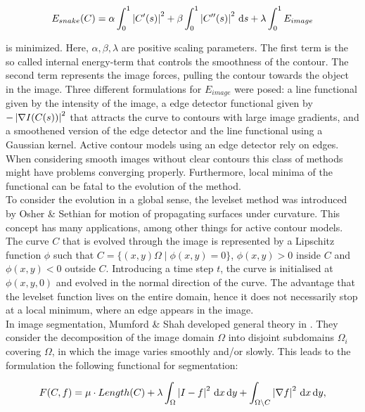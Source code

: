 \begin{equation}
  E_{snake}(C) = \alpha\int_0^1 \left| {C'(s)} \right|^2  + \beta\int_0^1 \left| {C''(s)} \right|^2\,{\rm d} s + \lambda\int_0^1 E_{image}
\end{equation}

is minimized. Here, $\alpha, \beta, \lambda$ are positive scaling parameters. The first term is the so called internal energy-term that controls the smoothness of the contour. The second term represents the image forces, pulling the contour towards the object in the image. Three different formulations for $E_{image}$ were posed: a line functional given by the intensity of the image, a edge detector functional given by $-\left| {\nabla I(C(s))} \right|^2$ that attracts the curve to contours with large image gradients, and a smoothened version of the edge detector and the line functional using a Gaussian kernel. Active contour models using an edge detector rely on edges. When considering smooth images without clear contours this class of methods might have problems converging properly. Furthermore, local minima of the functional can be fatal to the evolution of the method.\\

To consider the evolution in a global sense, the levelset method was introduced by Osher \& Sethian \cite{osher.88} for motion of propagating surfaces under curvature. This concept has many applications, among other things for active contour models. The curve $C$ that is evolved through the image is represented by a Lipschitz function $\phi$ such that $C=\{(x,y)\Omega\;|\; \phi(x,y) = 0\}$, $\phi(x,y)> 0$ inside $C$ and $\phi(x,y)<0$ outside $C$. Introducing a time step $t$, the curve is initialised at $\phi(x,y,0)$ and evolved in the normal direction of the curve. The advantage that the levelset function lives on the entire domain, hence it does not necessarily stop at a local minimum, where an edge appears in the image.\\

In image segmentation, Mumford \& Shah developed general theory in \cite{mumford.89}. They consider the decomposition of the image domain $\Omega$ into disjoint subdomains $\Omega_i$ covering $\Omega$, in which the image varies smoothly and/or slowly. This leads to the formulation the following functional for segmentation:

\begin{equation}
  F(C,f) = \mu\cdot Length(C) + \lambda \int_\Omega \left| {I-f} \right|^2 \,{\rm d} x\,{\rm d} y + \int_{\Omega\backslash C} \left| {\nabla f} \right|^2 \,{\rm d} x\,{\rm d} y,
\end{equation}

